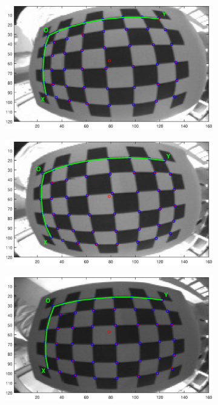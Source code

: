 \begin{figure}[h]
\begin{subfigure}[b]{0.4\textwidth}
    \end{subfigure}
	\begin{subfigure}[b]{0.4\textwidth}
        \centering
        \includegraphics[width=\textwidth]{images/camera/Reproj4.eps}
    \end{subfigure}
	\begin{subfigure}[b]{0.4\textwidth}
        \centering
        \includegraphics[width=\textwidth]{images/camera/Reproj3.eps}
    \end{subfigure}
	\begin{subfigure}[b]{0.4\textwidth}
        \centering
        \includegraphics[width=\textwidth]{images/camera/Reproj2.eps}

\end{subfigure}
\end{figure}
